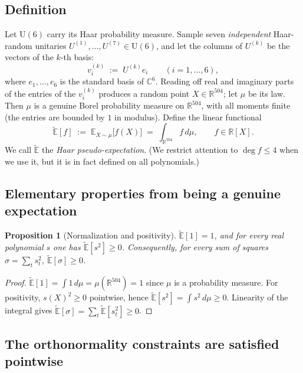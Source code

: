 \documentclass{amsart}
\newtheorem{proposition}{Proposition}
\theoremstyle{definition}
\theoremstyle{remark}
\begin{document}
\subsection{Definition}
Let $\mathrm{U}(6)$ carry its Haar probability measure. Sample seven \emph{independent}
Haar-random unitaries $U^{(1)},\dots,U^{(7)}\in\mathrm{U}(6)$, and let the columns of $U^{(k)}$
be the vectors of the $k$-th basis:
\begin{equation}\label{eq:sampling}
v^{(k)}_i \;:=\; U^{(k)} e_i\qquad(i=1,\dots,6),
\end{equation}
where $e_1,\dots,e_6$ is the standard basis of $\mathbb{C}^6$. Reading off real and imaginary
parts of the entries of the $v^{(k)}_i$ produces a random point $X\in\mathbb{R}^{504}$; let
$\mu$ be its law. Then $\mu$ is a genuine Borel probability measure on $\mathbb{R}^{504}$, with
all moments finite (the entries are bounded by $1$ in modulus). Define the linear functional
\begin{equation}\label{eq:Edef}
\widetilde{\mathbb{E}}[f]\;:=\;\mathbb{E}_{X\sim\mu}\bigl[f(X)\bigr]\;=\;\int_{\mathbb{R}^{504}} f\,d\mu ,
\qquad f\in\mathbb{R}[X].
\end{equation}
We call $\widetilde{\mathbb{E}}$ the \emph{Haar pseudo-expectation}. (We restrict attention to
$\deg f\le 4$ when we use it, but it is in fact defined on all polynomials.)

\subsection{Elementary properties from being a genuine expectation}

\begin{proposition}[Normalization and positivity]\label{prop:posnorm}
$\widetilde{\mathbb{E}}[1]=1$, and for every real polynomial $s$ one has
$\widetilde{\mathbb{E}}[s^2]\ge 0$. Consequently, for every sum of squares
$\sigma=\sum_t s_t^2$, $\widetilde{\mathbb{E}}[\sigma]\ge 0$.
\end{proposition}

\begin{proof}
$\widetilde{\mathbb{E}}[1]=\int 1\,d\mu=\mu(\mathbb{R}^{504})=1$ since $\mu$ is a probability
measure. For positivity, $s(X)^2\ge0$ pointwise, hence
$\widetilde{\mathbb{E}}[s^2]=\int s^2\,d\mu\ge0$. Linearity of the integral gives
$\widetilde{\mathbb{E}}[\sigma]=\sum_t\widetilde{\mathbb{E}}[s_t^2]\ge0$. \qedhere
\end{proof}

\subsection{The orthonormality constraints are satisfied pointwise}
\end{document}
